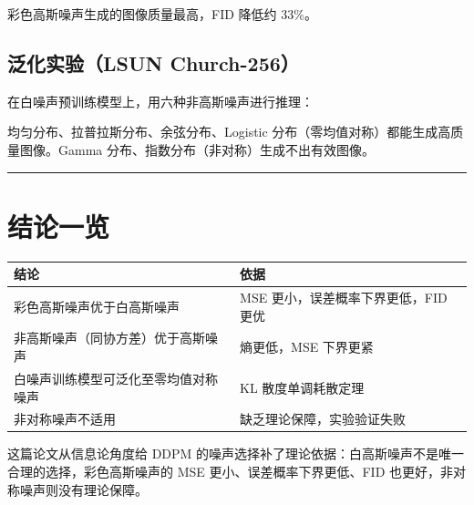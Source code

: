 彩色高斯噪声生成的图像质量最高，FID 降低约 33\%。

\subsection{泛化实验（LSUN Church-256）}

在白噪声预训练模型上，用六种非高斯噪声进行推理：

均匀分布、拉普拉斯分布、余弦分布、Logistic 分布（零均值对称）都能生成高质量图像。Gamma 分布、指数分布（非对称）生成不出有效图像。

\hrule

\section{结论一览}

\begin{center}
\begin{tabular}{ll}
\toprule
结论 & 依据 \\
\midrule
彩色高斯噪声优于白高斯噪声 & MSE 更小，误差概率下界更低，FID 更优 \\
非高斯噪声（同协方差）优于高斯噪声 & 熵更低，MSE 下界更紧 \\
白噪声训练模型可泛化至零均值对称噪声 & KL 散度单调耗散定理 \\
非对称噪声不适用 & 缺乏理论保障，实验验证失败 \\
\bottomrule
\end{tabular}
\end{center}

这篇论文从信息论角度给 DDPM 的噪声选择补了理论依据：白高斯噪声不是唯一合理的选择，彩色高斯噪声的 MSE 更小、误差概率下界更低、FID 也更好，非对称噪声则没有理论保障。
